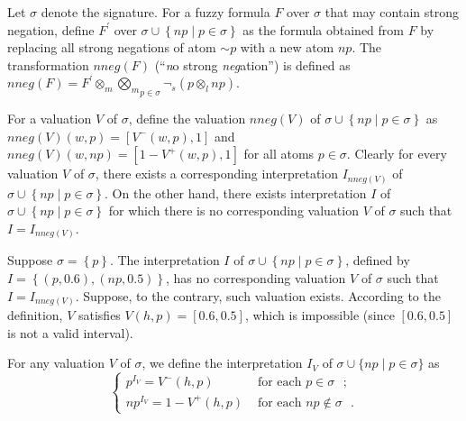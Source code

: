 \documentclass[runningheads]{llncs}
\newcommand{\cgre}{\color{green}}
\newcommand{\cbla}{\color{black}}
\def\i#1{\hbox{\it #1\/}}
\def\sneg{\sim\!\!}
\def\i#1{\hbox{\itshape #1\/}}
\begin{document}

Let $\sigma$ denote the signature. For a fuzzy formula $F$ over $\sigma$
that may contain strong negation, define $F^\prime$ over
$\sigma \cup \left\{np \mid p \in \sigma\right\}$ as the formula
obtained from $F$ by replacing all strong negations of atom $\sneg p$
with a new atom $np$. The transformation $nneg(F)$ (``{\sl n}o strong {\sl neg}ation'') is defined as
$nneg(F)=F^\prime \otimes_m \underset{p\in \sigma}{\bigotimes_m}\neg_s(p
\otimes_l np)$. 

\BOCC
\cgre
For a valuation $V$ of $\sigma$, define the valuation $nneg(V)$ of
$\sigma \cup \left\{np \mid p \in \sigma\right\}$ as $nneg(V)(w, p) =
\left[V^-(w, p), 1\right]$ and $nneg(V)(w, np) = \left[1-V^+(w, p),
  1\right]$ for all atoms $p \in \sigma$. Clearly for every valuation
$V$ of $\sigma$, there exists a corresponding interpretation
$I_{nneg(V)}$ of $\sigma \cup \left\{np \mid p \in \sigma\right\}$. On
the other hand, there exists interpretation $I$ of $\sigma \cup
\left\{np \mid p \in \sigma\right\}$ for which there is no
corresponding valuation $V$ of $\sigma$ such that $I=I_{nneg(V)}$.

\begin{example}
Suppose $\sigma=\left\{p\right\}$. The interpretation $I$ of $\sigma
\cup \left\{np \mid p \in \sigma\right\}$, defined by $I=\left\{(p,
  0.6), (np, 0.5)\right\}$, has no corresponding valuation $V$ of
$\sigma$ such that $I=I_{nneg(V)}$. Suppose, to the contrary, such
valuation exists. According to the definition, $V$ satisfies $V(h,
p)=\left[0.6, 0.5\right]$, which is impossible (since $\left[0.6,
  0.5\right]$ is not a valid interval).
\end{example}
\cbla 
\EOCC


For any valuation $V$ of $\sigma$, we define the interpretation $I_V$
of $\sigma\cup\{np \mid p\in\sigma\}$ as 
\[
\begin{cases}
  p^{I_V} = V^-(h,p)  & \text{ for each $p\in\sigma$ };  \\
  np^{I_V} = 1 - V^+(h,p) & \text{ for each $np\notin\sigma$ }.
\end{cases}
\]

\end{document}
